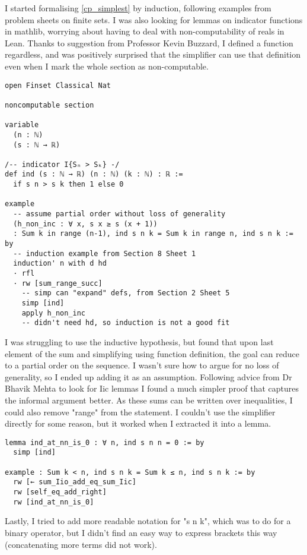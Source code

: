 \documentclass[a4paper, 12pt]{article}
\begin{document}
I started formalising \ref{cp_simplest} by induction,
following examples from problem sheets on finite sets.
I was also looking for lemmas on indicator functions in mathlib,
worrying about having to deal with non-computability of reals in Lean.
Thanks to suggestion from Professor Kevin Buzzard, I defined a function regardless,
and was positively surprised that the simplifier can use that definition
even when I mark the whole section as non-computable.

\begin{lstlisting}
open Finset Classical Nat

noncomputable section

variable
  (n : ℕ)
  (s : ℕ → ℝ)

/-- indicator I{Sₙ > Sₖ} -/
def ind (s : ℕ → ℝ) (n : ℕ) (k : ℕ) : ℝ :=
  if s n > s k then 1 else 0

example
  -- assume partial order without loss of generality
  (h_non_inc : ∀ x, s x ≥ s (x + 1))
  : Sum k in range (n-1), ind s n k = Sum k in range n, ind s n k := by
  -- induction example from Section 8 Sheet 1
  induction' n with d hd
  · rfl
  · rw [sum_range_succ]
    -- simp can "expand" defs, from Section 2 Sheet 5
    simp [ind]
    apply h_non_inc
    -- didn't need hd, so induction is not a good fit
\end{lstlisting}

I was struggling to use the inductive hypothesis,
but found that upon last element of the sum
and simplifying using function definition,
the goal can reduce to a partial order on the sequence.
I wasn't sure how to argue for no loss of generality,
so I ended up adding it as an assumption.
Following advice from Dr Bhavik Mehta to look for Iic lemmas
I found a much simpler proof that captures the informal argument better.
As these sums can be written over inequalities,
I could also remove "range" from the statement.
I couldn't use the simplifier directly for some reason,
but it worked when I extracted it into a lemma.

\begin{lstlisting}
lemma ind_at_nn_is_0 : ∀ n, ind s n n = 0 := by
  simp [ind]

example : Sum k < n, ind s n k = Sum k ≤ n, ind s n k := by
  rw [← sum_Iio_add_eq_sum_Iic]
  rw [self_eq_add_right]
  rw [ind_at_nn_is_0]
\end{lstlisting}

Lastly, I tried to add more readable notation for "s n k",
which was to do for a binary operator,
but I didn't find an easy way to express brackets this way
(concatenating more terms did not work).
\end{document}
